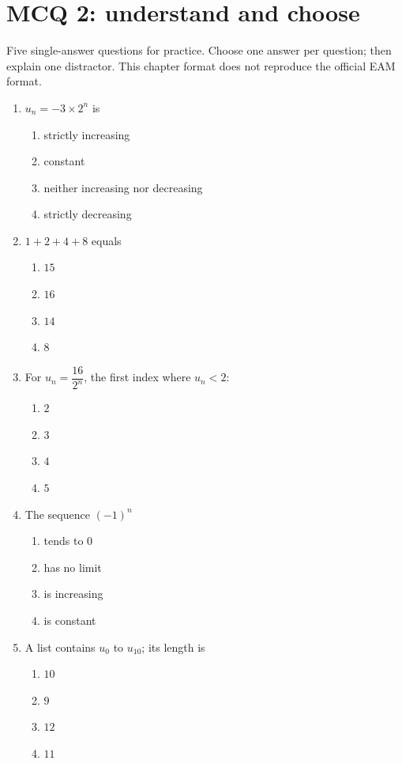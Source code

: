 \endgroup
\begingroup\small
{}\section*{MCQ 2: understand and choose}\label{C01-Q2}
Five single-answer questions for practice. Choose one answer per question; then explain one distractor. This chapter format does not reproduce the official EAM format.
\begin{enumerate}
\item $u_n=-3\times2^n$ is
\begin{enumerate}[label=\Alph*.,itemsep=2pt]
\item strictly increasing
\item constant
\item neither increasing nor decreasing
\item strictly decreasing
\end{enumerate}
\item $1+2+4+8$ equals
\begin{enumerate}[label=\Alph*.,itemsep=2pt]
\item $15$
\item $16$
\item $14$
\item $8$
\end{enumerate}
\item For $u_n=\dfrac{16}{2^n}$, the first index where $u_n<2$:
\begin{enumerate}[label=\Alph*.,itemsep=2pt]
\item $2$
\item $3$
\item $4$
\item $5$
\end{enumerate}
\item The sequence $(-1)^n$
\begin{enumerate}[label=\Alph*.,itemsep=2pt]
\item tends to 0
\item has no limit
\item is increasing
\item is constant
\end{enumerate}
\item A list contains $u_0$ to $u_{10}$; its length is
\begin{enumerate}[label=\Alph*.,itemsep=2pt]
\item $10$
\item $9$
\item $12$
\item $11$
\end{enumerate}
\end{enumerate}
